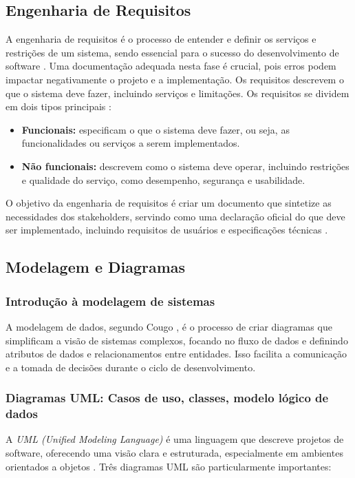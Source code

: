 \subsection{Engenharia de Requisitos}
A engenharia de requisitos é o processo de entender e definir os serviços e restrições de um sistema, sendo essencial para o sucesso do desenvolvimento de software \cite{sommerville2011}. Uma documentação adequada nesta fase é crucial, pois erros podem impactar negativamente o projeto e a implementação. Os requisitos descrevem o que o sistema deve fazer, incluindo serviços e limitações.
Os requisitos se dividem em dois tipos principais \cite{valente2020}:

\begin{itemize}
    \item \textbf{Funcionais:} especificam o que o sistema deve fazer, ou seja, as funcionalidades ou serviços a serem implementados.
    \item \textbf{Não funcionais:} descrevem como o sistema deve operar, incluindo restrições e qualidade do serviço, como desempenho, segurança e usabilidade.
\end{itemize}

O objetivo da engenharia de requisitos é criar um documento que sintetize as necessidades dos stakeholders, servindo como uma declaração oficial do que deve ser implementado, incluindo requisitos de usuários e especificações técnicas \cite{sommerville2011}.

\subsection{Modelagem e Diagramas}

\subsubsection{Introdução à modelagem de sistemas}
A modelagem de dados, segundo Cougo  \cite{cougo1997}, é o processo de criar diagramas que simplificam a visão de sistemas complexos, focando no fluxo de dados e definindo atributos de dados e relacionamentos entre entidades. Isso facilita a comunicação e a tomada de decisões durante o ciclo de desenvolvimento.

\subsubsection{Diagramas UML: Casos de uso, classes, modelo lógico de dados}
A \textit{UML (Unified Modeling Language)} é uma linguagem que descreve projetos de software, oferecendo uma visão clara e estruturada, especialmente em ambientes orientados a objetos \cite{fowler2005}. Três diagramas UML são particularmente importantes:

